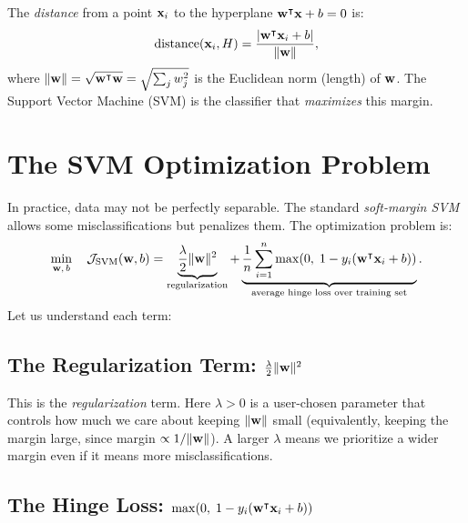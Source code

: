 \documentclass[11pt, letterpaper]{article}
\newcommand{\obj}{\mathcal{J}}
\begin{document}
The \emph{distance} from a point $\vb{x}_i$ to the hyperplane $\vb{w}^{\intercal} \vb{x} + b = 0$ is:
\begin{equation}
    \text{distance}(\vb{x}_i, H) = \frac{|\vb{w}^{\intercal} \vb{x}_i + b|}{\|\vb{w}\|},
\end{equation}
where $\|\vb{w}\| = \sqrt{\vb{w}^{\intercal} \vb{w}} = \sqrt{\sum_j w_j^2}$ is the Euclidean norm (length) of $\vb{w}$. The Support Vector Machine (SVM) is the classifier that \emph{maximizes} this margin.

\section{The SVM Optimization Problem}\label{sec:svm_opt}

In practice, data may not be perfectly separable. The standard \emph{soft-margin SVM} allows some misclassifications but penalizes them. The optimization problem is:
\begin{equation}\label{eq:svm_objective}
    \min_{\vb{w},\, b}\quad \obj_{\text{SVM}}(\vb{w}, b) = \underbrace{\frac{\lambda}{2}\|\vb{w}\|^2}_{\text{regularization}} + \underbrace{\frac{1}{n}\sum_{i=1}^{n} \max\!\left(0,\; 1 - y_i\!\left(\vb{w}^{\intercal} \vb{x}_i + b\right)\right)}_{\text{average hinge loss over training set}}.
\end{equation}
Let us understand each term:

\subsection{The Regularization Term: $\frac{\lambda}{2}\|\vb{w}\|^2$}

This is the \emph{regularization} term. Here $\lambda > 0$ is a user-chosen parameter that controls how much we care about keeping $\|\vb{w}\|$ small (equivalently, keeping the margin large, since margin $\propto 1/\|\vb{w}\|$). A larger $\lambda$ means we prioritize a wider margin even if it means more misclassifications.

\subsection{The Hinge Loss: $\max(0,\; 1 - y_i(\vb{w}^{\intercal} \vb{x}_i + b))$}
\end{document}
